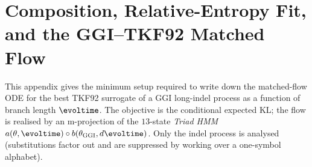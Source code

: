 %

\providecommand\evolu{u}
\providecommand\ggigen{G_{\mathrm{GGI}}}
\providecommand\ggikern{\mathbb{G}}
\providecommand\dkl[2]{D\!\left(#1\,\middle\|\,#2\right)}
\providecommand\ggi{\mathrm{GGI}}
\providecommand\nfragext{F}
\providecommand\nfragend{\bar F}
\providecommand\mat{\mathtt{M}}
\providecommand\ins{\mathtt{I}}
\providecommand\del{\mathtt{D}}
\providecommand\sta{\mathtt{S}}
\providecommand\fin{\mathtt{E}}
\providecommand\nul{\mathtt{N}}
\providecommand\ymx{a}
\providecommand\zmx{b}
\providecommand\ty[1]{a_{#1}}
\providecommand\tz[1]{b_{#1}}
\providecommand\triadstart{\mathtt{SS}}
\providecommand\stains{\mathtt{sI}}
\providecommand\matmat{\mathtt{MM}}
\providecommand\matins{\mathtt{mI}}
\providecommand\matdel{\mathtt{MD}}
\providecommand\insmat{\mathtt{IM}}
\providecommand\insins{\mathtt{iI}}
\providecommand\insdel{\mathtt{ID}}
\providecommand\delsta{\mathtt{Ds}}
\providecommand\delmat{\mathtt{Dm}}
\providecommand\delins{\mathtt{Di}}
\providecommand\deldel{\mathtt{Dd}}
\providecommand\triadend{\mathtt{EE}}
\providecommand\jointpairmatrix{\ymx}
\providecommand\condpairmatrix{\zmx}
\providecommand\jointpairhmm{\jointpairmatrix}
\providecommand\condpairhmm{\condpairmatrix}
\providecommand\fragext{\ext}
\providecommand\triadstates{\mathcal{S}_{\rm triad}}
\providecommand\texorpdfstring[2]{#1}
\providecommand\toLower{\mathrm{lc}}
\providecommand\ancestor{x}
\providecommand\descendant{y}
\providecommand\anc{\ancestor}
\providecommand\desc{\descendant}

\section{Composition, Relative-Entropy Fit, and the GGI--TKF92 Matched Flow}
\label{sec:composition-renorm}

This appendix gives the minimum setup required to write down the matched-flow
ODE for the best TKF92 surrogate of a GGI long-indel process as a function of
branch length $\evoltime$.  The objective is the conditional expected KL; the
flow is realised by an m-projection of the $13$-state \emph{Triad HMM}
$\jointpairhmm(\theta,\evoltime)\circ\condpairhmm(\theta_\ggi,d\evoltime)$.
Only the indel process is analysed (substitutions factor out and are
suppressed by working over a one-symbol alphabet).

